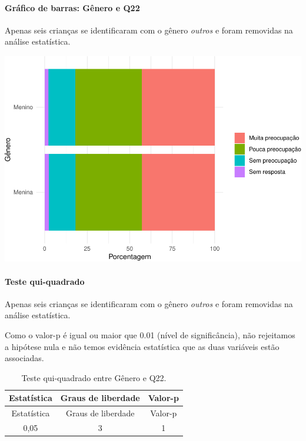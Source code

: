 \documentclass[]{article}
\let\oldparagraph\paragraph
\renewcommand{\paragraph}[1]{\oldparagraph{#1}\mbox{}}
\begin{document}
\hypertarget{gruxe1fico-de-barras-guxeanero-e-q22}{%
\paragraph{Gráfico de barras: Gênero e Q22}\label{gruxe1fico-de-barras-guxeanero-e-q22}}

Apenas seis crianças se identificaram com o gênero \emph{outros} e foram removidas na análise estatística.

\begin{center}\includegraphics[width=0.75\linewidth]{relatorio_covid19_files/figure-latex/unnamed-chunk-495-1} \end{center}

\hypertarget{teste-qui-quadrado-43}{%
\paragraph{Teste qui-quadrado}\label{teste-qui-quadrado-43}}

Apenas seis crianças se identificaram com o gênero \emph{outros} e foram removidas na análise estatística.

Como o valor-p é igual ou maior que 0.01 (nível de significância), não rejeitamos a hipótese nula e não temos evidência estatística que as duas variáveis estão associadas.

\begin{longtable}[]{@{}ccc@{}}
\caption{\label{tab:unnamed-chunk-497}Teste qui-quadrado entre Gênero e Q22.}\tabularnewline
\toprule
Estatística & Graus de liberdade & Valor-p\tabularnewline
\midrule
\endfirsthead
\toprule
Estatística & Graus de liberdade & Valor-p\tabularnewline
\midrule
\endhead
0,05 & 3 & 1\tabularnewline
\bottomrule
\end{longtable}

\cleardoublepage
\end{document}
